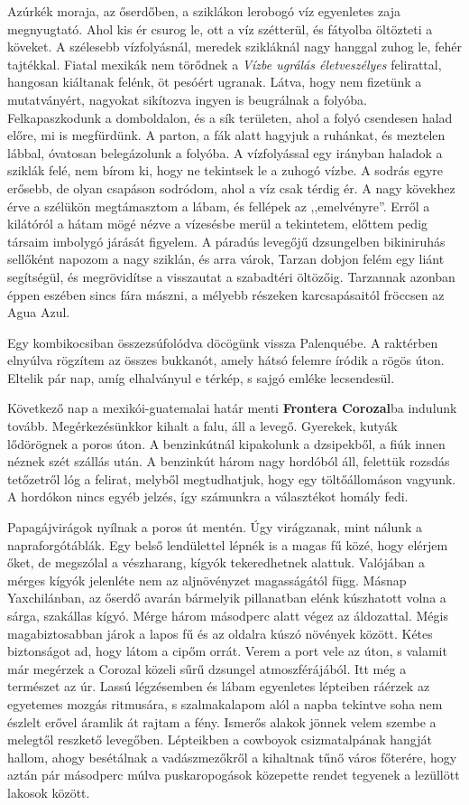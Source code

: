 Azúrkék moraja, az őserdőben, a sziklákon lerobogó víz egyenletes
zaja megnyugtató. Ahol kis ér csurog le, ott a víz szétterül, és fátyolba
öltözteti a köveket. A szélesebb vízfolyásnál, meredek szikláknál nagy
hanggal zuhog le, fehér tajtékkal. Fiatal mexikák nem törődnek a
\textit{Vízbe ugrálás életveszélyes} felirattal, hangosan kiáltanak
felénk, öt pesóért
ugranak. Látva, hogy nem fizetünk a mutatványért, nagyokat sikítozva
ingyen is beugrálnak a folyóba. Felkapaszkodunk a domboldalon, és
a sík területen, ahol a folyó csendesen halad előre, mi is megfürdünk.
A parton, a fák alatt hagyjuk a ruhánkat, és meztelen lábbal, óvatosan
belegázolunk a folyóba. A vízfolyással egy irányban haladok a sziklák
felé, nem bírom ki, hogy ne tekintsek le a zuhogó vízbe. A sodrás
egyre erősebb, de olyan csapáson sodródom, ahol a víz csak térdig ér.
A nagy kövekhez érve a szélükön megtámasztom a lábam, és fellépek
az ,,emelvényre''. Erről a kilátóról a hátam mögé nézve a vízesésbe
merül a tekintetem, előttem pedig társaim imbolygó járását figyelem.
A páradús levegőjű dzsungelben bikiniruhás sellőként napozom a
nagy sziklán, és arra várok, Tarzan dobjon felém egy liánt segítségül,
és megrövidítse a visszautat a szabadtéri öltözőig. Tarzannak azonban
éppen eszében sincs fára mászni, a mélyebb részeken karcsapásaitól
fröccsen az Agua Azul.

Egy kombikocsiban összezsúfolódva döcögünk vissza Palenquébe.
A raktérben elnyúlva rögzítem az összes bukkanót, amely hátsó felemre
íródik a rögös úton. Eltelik pár nap, amíg elhalványul e térkép,
s sajgó emléke lecsendesül.

Következő nap a mexikói-guatemalai határ menti \textbf{Frontera Corozal}ba
indulunk tovább. Megérkezésünkkor kihalt a falu, áll a levegő.
Gyerekek, kutyák lődörögnek a poros úton. A benzinkútnál kipakolunk
a dzsipekből, a fiúk innen néznek szét szállás után. A benzinkút
három nagy hordóból áll, felettük rozsdás tetőzetről lóg a felirat,
melyből megtudhatjuk, hogy egy töltőállomáson vagyunk. A hordókon
nincs egyéb jelzés, így számunkra a választékot homály fedi.

Papagájvirágok nyílnak a poros út mentén. Úgy virágzanak, mint
nálunk a napraforgótáblák. Egy belső lendülettel lépnék is a magas
fű közé, hogy elérjem őket, de megszólal a vészharang, kígyók tekeredhetnek
alattuk. Valójában a mérges kígyók jelenléte nem az aljnövényzet
magasságától függ. Másnap Yaxchilánban, az őserdő avarán
bármelyik pillanatban elénk kúszhatott volna a sárga, szakállas kígyó.
Mérge három másodperc alatt végez az áldozattal. Mégis magabiztosabban
járok a lapos fű és az oldalra kúszó növények között. Kétes
biztonságot ad, hogy látom a cipőm orrát. Verem a port vele az úton,
s valamit már megérzek a Corozal közeli sűrű dzsungel atmoszférájából.
Itt még a természet az úr. Lassú légzésemben és lábam egyenletes
lépteiben ráérzek az egyetemes mozgás ritmusára, s szalmakalapom
alól a napba tekintve soha nem észlelt erővel áramlik át rajtam a fény.
Ismerős alakok jönnek velem szembe a melegtől reszkető levegőben.
Lépteikben a cowboyok csizmatalpának hangját hallom, ahogy besétálnak
a vadászmezőkről a kihaltnak tűnő város főterére, hogy aztán
pár másodperc múlva puskaropogások közepette rendet tegyenek a
lezüllött lakosok között.

